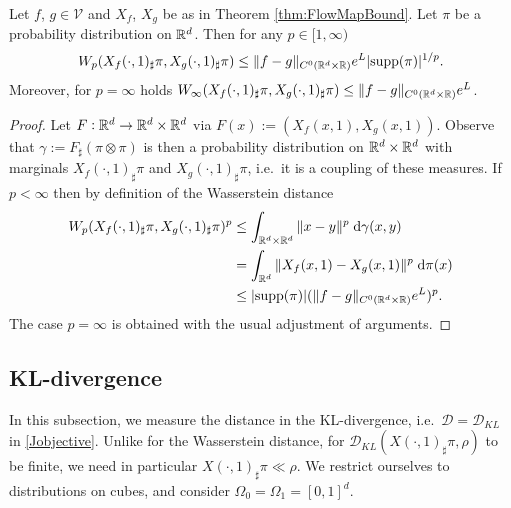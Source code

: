 \begin{corollary}\label{cor:Wp}
  Let $f$, $g\in\mathcal{V}$ and $X_f$, $X_g$ be as in Theorem
  \ref{thm:FlowMapBound}. Let $\pi$ be a probability distribution on
  $\mathbb{R}^d$. Then for any $p\in [1,\infty)$
  \begin{equation*}
    W_p(X_f(\cdot,1)_\sharp\pi, X_g(\cdot,1)_\sharp\pi) \le
    \|f-g\|_{C^0(\mathbb{R}^d\times\mathbb{R})} e^{L}
      |{\rm supp}(\pi)|^{1/p}.
    \end{equation*}
    Moreover, for $p=\infty$ holds
    $W_\infty(X_f(\cdot,1)_\sharp\pi, X_g(\cdot,1)_\sharp\pi) \le
    \|f-g\|_{C^0(\mathbb{R}^d\times\mathbb{R})} e^{L}$.
\end{corollary}
\begin{proof}
  Let $F:\mathbb{R}^d\to\mathbb{R}^d\times\mathbb{R}^d$ via
  $F(x):=(X_f(x,1),X_g(x,1))$. Observe that $\gamma:=F_\sharp(\pi\otimes\pi)$ is
  then a probability distribution on $\mathbb{R}^d\times\mathbb{R}^d$ with marginals
  $X_f(\cdot,1)_\sharp\pi$ and $X_g(\cdot,1)_\sharp\pi$, i.e.\ it is a coupling
  of these measures. If $p<\infty$ then by definition of the Wasserstein distance
  \begin{align*}
    W_p(X_f(\cdot,1)_\sharp\pi, X_g(\cdot,1)_\sharp\pi)^p
    &\le \int_{\mathbb{R}^d\times\mathbb{R}^d}\|x-y\|^p\;\mathrm{d}\gamma(x,y)\nonumber\\
    &=\int_{\mathbb{R}^d}\|X_f(x,1)-X_g(x,1)\|^p\;\mathrm{d}\pi(x)\nonumber\\
    &\le |{\rm supp}(\pi)|(\|f-g\|_{C^0(\mathbb{R}^d\times\mathbb{R})} e^{L})^p.
  \end{align*}
  The case $p=\infty$ is obtained with the usual adjustment of arguments.
\end{proof}


\subsection{KL-divergence}
In this subsection, we %
measure the distance in the KL-divergence, i.e.\
$\mathcal{D} = \mathcal{D}_{KL}$ in \eqref{Jobjective}. Unlike for the Wasserstein distance,
for $\mathcal{D}_{KL}(X(\cdot,1)_\sharp\pi,\rho)$ to be finite, we need in particular $X(\cdot, 1)_\sharp\pi\ll \rho$.
We restrict ourselves to distributions on cubes, and consider $\Omega_0 = \Omega_1 = [0,1]^d$.


